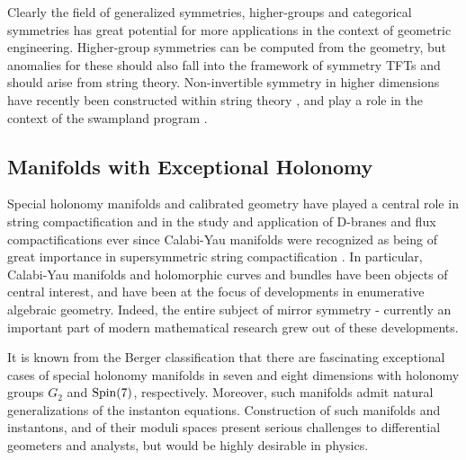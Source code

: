 \documentclass[12pt]{article}
\begin{document}
Clearly the field of generalized symmetries, higher-groups and categorical symmetries has great potential for more applications in the context of geometric engineering. Higher-group symmetries can be computed from the geometry, but anomalies for these should also fall into the framework of symmetry TFTs and should arise from string theory. Non-invertible symmetry in higher dimensions have recently been constructed within string theory \cite{Apruzzi:2022rei, Gaiotto:2020iye, GarciaEtxebarria:2022vzq, Heckman:2022muc}, and  play a  role in the context of the swampland program \cite{Heidenreich:2021xpr}.  




\subsection{Manifolds with Exceptional Holonomy}
\label{sec:ExHol}

Special holonomy manifolds and calibrated geometry
have played a central role in string compactification
and in the study and application of D-branes and flux
compactifications ever since Calabi-Yau manifolds were
recognized as being of great importance in supersymmetric
string compactification  \cite{Candelas:1985en}.  In particular,
Calabi-Yau manifolds and holomorphic curves and bundles
have been objects of central interest, and have been at the
focus of developments in enumerative algebraic geometry.
Indeed, the entire subject of mirror symmetry - currently
an important part of modern mathematical research grew
out of these developments.

It is known from the Berger classification that there are
fascinating exceptional cases of special holonomy manifolds
in seven and eight dimensions with holonomy groups $G_2$ and
${\rm Spin}(7)$, respectively. Moreover, such manifolds admit
natural generalizations of the instanton equations.   Construction of
such manifolds and instantons, and of their moduli spaces present serious
challenges to differential geometers and analysts, but would be highly desirable in physics.
\end{document}

